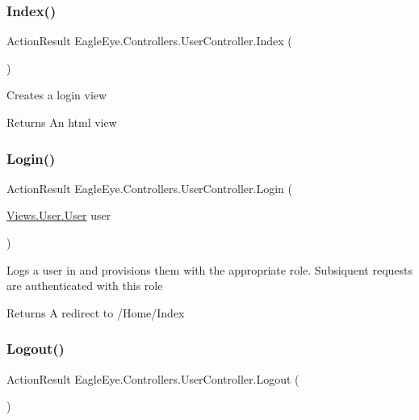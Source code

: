 \subsubsection{\texorpdfstring{Index()}{Index()}}
{\footnotesize\ttfamily Action\+Result Eagle\+Eye.\+Controllers.\+User\+Controller.\+Index (\begin{DoxyParamCaption}{ }\end{DoxyParamCaption})}



Creates a login view 

\begin{DoxyReturn}{Returns}
An html view 
\end{DoxyReturn}
\mbox{\label{class_eagle_eye_1_1_controllers_1_1_user_controller_ad2199840c954a1a465e25087fee02564}} 
\subsubsection{\texorpdfstring{Login()}{Login()}}
{\footnotesize\ttfamily Action\+Result Eagle\+Eye.\+Controllers.\+User\+Controller.\+Login (\begin{DoxyParamCaption}\item[{\mbox{\hyperlink{class_eagle_eye_1_1_views_1_1_user_1_1_user}{Views.\+User.\+User}}}]{user }\end{DoxyParamCaption})}



Logs a user in and provisions them with the appropriate role. Subsiquent requests are authenticated with this role 

\begin{DoxyReturn}{Returns}
A redirect to /\+Home/\+Index
\end{DoxyReturn}
\mbox{\label{class_eagle_eye_1_1_controllers_1_1_user_controller_a23b7abc37b240a70620675d09edecf8c}} 
\subsubsection{\texorpdfstring{Logout()}{Logout()}}
{\footnotesize\ttfamily Action\+Result Eagle\+Eye.\+Controllers.\+User\+Controller.\+Logout (\begin{DoxyParamCaption}{ }\end{DoxyParamCaption})}



